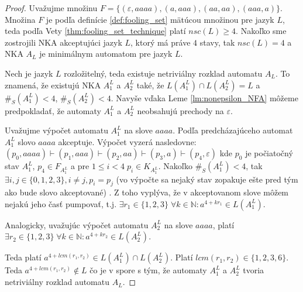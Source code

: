 \begin{proof}
Uvažujme množinu $ F = \lbrace (\varepsilon,aaaa),(a,aaa),(aa,aa),(aaa,a)\rbrace $. Množina $ F $ je podľa definície \ref{def:fooling_set} mätúcou množinou pre jazyk $ L $, teda podľa Vety \ref{thm:fooling_set_technique} platí $ nsc(L) \geq 4 $. Nakoľko sme zostrojili NKA akceptujúci jazyk $ L $, ktorý má práve $ 4 $ stavy, tak $ nsc(L) = 4 $ a NKA $ A_{L} $ je minimálnym automatom pre jazyk $ L $.
\par
Nech je jazyk $ L$ rozložitelný, teda existuje netriviálny rozklad automatu $ A_{L} $. To znamená, že existujú NKA $ A_1^{L} $ a $ A_2^{L} $ také, že $ L(A_1^{L}) \cap L(A_2^{L}) = L $ a $ \#_S(A_1^{L}) < 4 $, $ \#_S(A_2^{L}) < 4 $. Navyše vďaka Leme \ref{lm:nonepsilon_NFA} môžeme predpokladať, že automaty $ A_1^{L} $ a $ A_2^{L} $ neobsahujú prechody na $ \varepsilon $. 
\par
Uvažujme výpočet automatu $ A_1^{L} $ na slove $ aaaa $. Podľa predcházajúceho automat $ A_1^{L} $ slovo $ aaaa $ akceptuje. Výpočet vyzerá nasledovne: $ (p_0,aaaa) \vdash (p_1, aaa) \vdash (p_{2}, aa) \vdash (p_3, a) \vdash (p_4, \varepsilon) $ kde $ p_0 $ je počiatočný stav $ A_1^{L} $, $ p_4 \in F_{A_1^{L}} $ a pre $ 1 \leq i < 4 \; p_i \in K_{A_1^{L}}$. Nakoľko $ \#_S(A_1^{L}) < 4 $, tak $ \exists i,j \in \lbrace 0,1,2,3 \rbrace, i \neq j, p_i=p_j $ (vo výpočte sa nejaký stav zopakuje ešte pred tým ako bude slovo akceptované) . Z toho vyplýva, že v akceptovanom slove môžem nejakú jeho časť pumpovať, t.j. $ \exists r_1 \in \lbrace 1,2,3 \rbrace \; \forall k \in \mathbb{N}: a^{4 + kr_1} \in L(A_1^{L}) $.
\par
Analogicky, uvažujúc výpočet automatu $ A_2^{L} $ na slove $ aaaa $, platí $ \exists r_2 \in \lbrace 1,2,3 \rbrace \; \forall k \in \mathbb{N}: a^{4 + kr_2} \in L(A_2^{L}) $.
\par
Teda platí $ a^{4 + lcm(r_1,r_2)} \in L(A_1^{L}) \cap L(A_2^{L}) $. Platí $ lcm(r_1,r_2) \in \lbrace 1,2,3,6 \rbrace $. Teda $ a^{4 + lcm(r_1,r_2)} \notin L $ čo je v spore s tým, že automaty $ A_1^{L} $ a $ A_2^{L} $ tvoria netriviálny rozklad automatu $ A_{L} $.
\end{proof}













